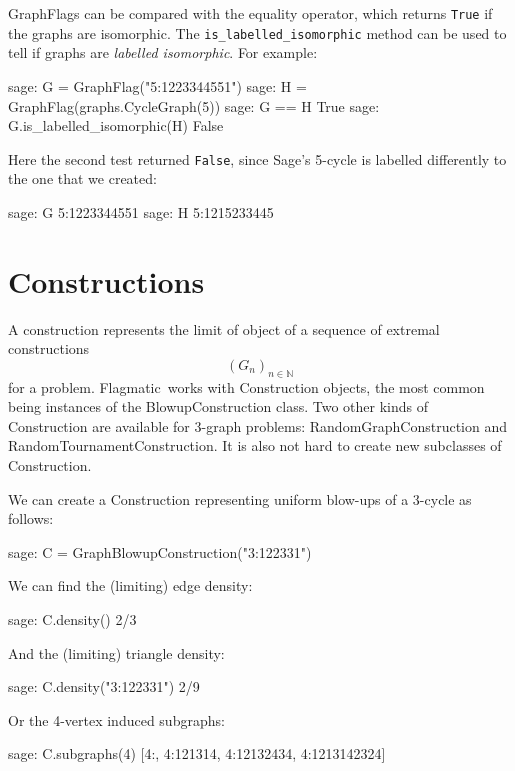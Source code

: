 \documentclass{article}
\providecommand{\flagmatic}{Flagmatic}
\begin{document}
GraphFlags can be compared with the equality operator, which returns \verb|True| if the graphs are isomorphic. The \verb|is_labelled_isomorphic| method can be used to tell if graphs are \emph{labelled isomorphic}. For example:

\begin{sage}
sage: G = GraphFlag("5:1223344551")
sage: H = GraphFlag(graphs.CycleGraph(5))
sage: G == H
True
sage: G.is_labelled_isomorphic(H)
False
\end{sage}

Here the second test returned \verb|False|, since Sage's 5-cycle is labelled differently to the one that we created:

\begin{sage}
sage: G
5:1223344551
sage: H
5:1215233445
\end{sage}

\section{Constructions}

A construction represents the limit of object of a sequence of extremal constructions
\[(G_n)_{n \in \mathbb{N}}\]
for a problem. \flagmatic\ works with Construction objects, the most common being instances of the BlowupConstruction class. Two other kinds of Construction are available for 3-graph problems: RandomGraphConstruction and RandomTournamentConstruction. It is also not hard to create new subclasses of Construction.

We can create a Construction representing uniform blow-ups of a 3-cycle as follows:

\begin{sage}
sage: C = GraphBlowupConstruction("3:122331")
\end{sage}

We can find the (limiting) edge density:

\begin{sage}
sage: C.density()
2/3
\end{sage}

And the (limiting) triangle density:

\begin{sage}
sage: C.density("3:122331")
2/9
\end{sage}

Or the 4-vertex induced subgraphs:

\begin{sage}
sage: C.subgraphs(4)
[4:, 4:121314, 4:12132434, 4:1213142324]
\end{sage}
\end{document}
